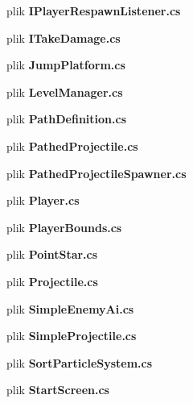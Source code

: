 \begin{DoxyCompactItemize}
\item 
plik {\bfseries I\+Player\+Respawn\+Listener.\+cs}
\item 
plik {\bfseries I\+Take\+Damage.\+cs}
\item 
plik {\bfseries Jump\+Platform.\+cs}
\item 
plik {\bfseries Level\+Manager.\+cs}
\item 
plik {\bfseries Path\+Definition.\+cs}
\item 
plik {\bfseries Pathed\+Projectile.\+cs}
\item 
plik {\bfseries Pathed\+Projectile\+Spawner.\+cs}
\item 
plik {\bfseries Player.\+cs}
\item 
plik {\bfseries Player\+Bounds.\+cs}
\item 
plik {\bfseries Point\+Star.\+cs}
\item 
plik {\bfseries Projectile.\+cs}
\item 
plik {\bfseries Simple\+Enemy\+Ai.\+cs}
\item 
plik {\bfseries Simple\+Projectile.\+cs}
\item 
plik {\bfseries Sort\+Particle\+System.\+cs}
\item 
plik {\bfseries Start\+Screen.\+cs}
\end{DoxyCompactItemize}
